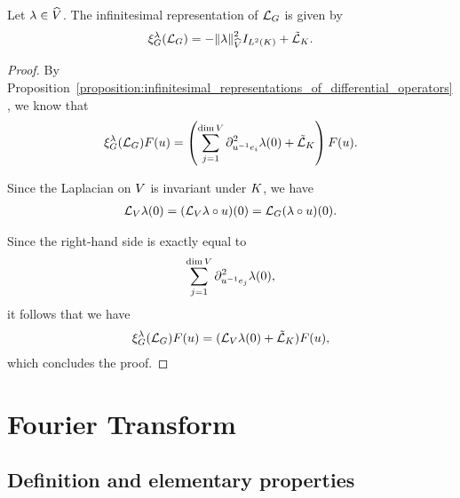 \begin{corollary}
\label{corollary:infinitesimal_representation_of_the_Laplacian}
    Let $\lambda \in \dualGroup{\VectorSpace}$.
    The infinitesimal representation of $\Laplacian$ is given by
    \begin{align*}
        \Rep{\lambda}(\Laplacian) = - \norm[\dualGroup{\VectorSpace}]{\lambda}^2 \Id{\Lebesgue{2}{\CompactGroup}} + \RightLaplacian[\CompactGroup].
    \end{align*}
\end{corollary}
\begin{proof}
    By Proposition~\ref{proposition:infinitesimal_representations_of_differential_operators},
    we know that
    \begin{align*}
        \Rep{\lambda}(\Laplacian) F(u) =
        \left(
            \sum_{j = 1}^{\dim \VectorSpace}
                \directionalDerivative{u^{-1} e_i}^2 \lambda(0)
                + \RightLaplacian[\CompactGroup]
        \right)
        F(u).
    \end{align*}

    Since the Laplacian on $\VectorSpace$ is invariant under $\CompactGroup$,
    we have
    \begin{align*}
        \Laplacian[\VectorSpace] \lambda(0)
        = (\Laplacian[\VectorSpace] \lambda \circ u)(0)
        = \Laplacian (\lambda \circ u)(0).
    \end{align*}

    Since the right-hand side is exactly equal to
    \begin{align*}
        \sum_{j = 1}^{\dim \VectorSpace} \directionalDerivative{u^{-1} e_j}^2 \lambda(0),
    \end{align*}
    it follows that we have
    \begin{align*}
        \Rep{\lambda}(\Laplacian) F(u)
        = (\Laplacian[\VectorSpace] \lambda(0) + \RightLaplacian[\CompactGroup]) F(u),
    \end{align*}
    which concludes the proof.
\end{proof}

\section{Fourier Transform}

\subsection{Definition and elementary properties}

